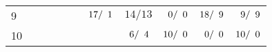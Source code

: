 \begin{table}[!t]
\begin{tabular}{G{4mm}G{0mm}|F{11.5mm}F{11.5mm}F{11.5mm}F{11.5mm}F{11.5mm}F{11.5mm}F{11.5mm}F{11.5mm}F{11.5mm}|}
{9} & & & & & & $17/\z1$ & $14/13$ & $\z0/\z0$ & $18/\z9$ & $\z9/\z9$\\[4pt]

{10} & & & & & & & $\z6/\z4$ & $10/\z0$ & $\z0/\z0$ & $10/\z0$\\[4pt]



\end{tabular}

\end{table}
\endgroup
